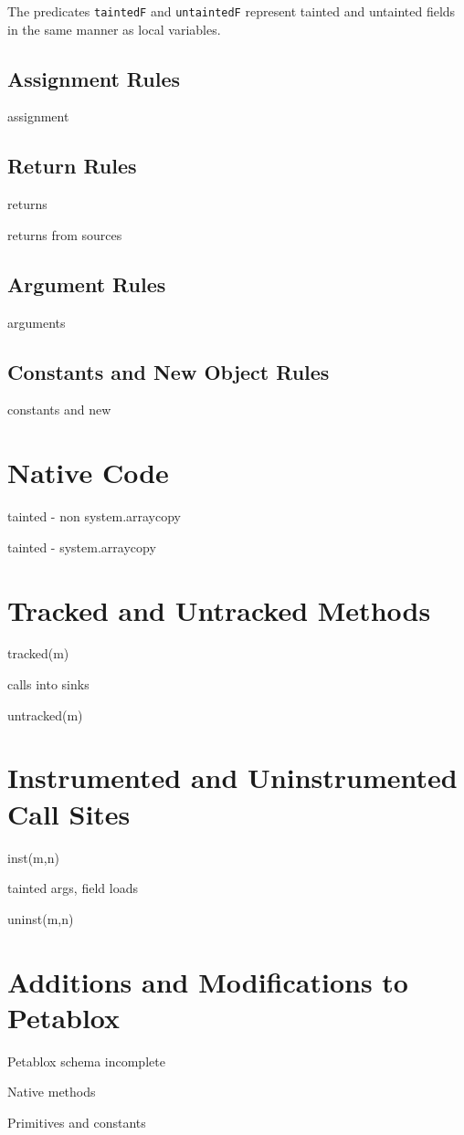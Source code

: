 The predicates \texttt{taintedF} and \texttt{untaintedF} represent tainted and untainted fields in the same manner as local variables.
\subsection{Assignment Rules}
assignment
\subsection{Return Rules}
returns

returns from sources
\subsection{Argument Rules}
arguments
\subsection{Constants and New Object Rules}
constants and new
\section{Native Code}
tainted - non system.arraycopy

tainted - system.arraycopy
\section{Tracked and Untracked Methods}
tracked(m)

calls into sinks

untracked(m)
\section{Instrumented and Uninstrumented Call Sites}
inst(m,n)

tainted args, field loads

uninst(m,n)
\section{Additions and Modifications to Petablox}
Petablox schema incomplete

Native methods

Primitives and constants
